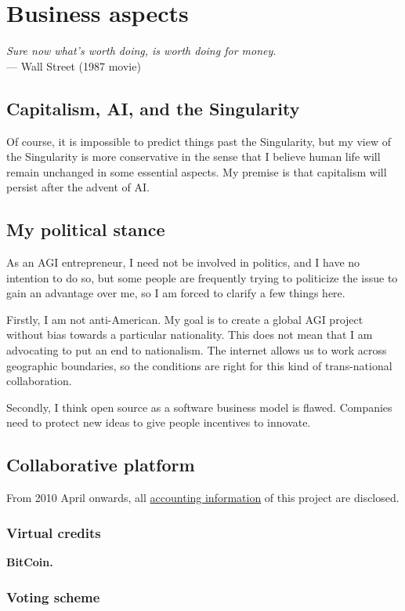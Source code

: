\chapter{Business aspects}
\begin{flushright}
\emph{Sure now what's worth doing, is worth doing for money.}\\
--- Wall Street (1987 movie)
\end{flushright}
\minitoc

\section{Capitalism, AI, and the Singularity}

Of course, it is impossible to predict things past the Singularity, but my view of the Singularity is more conservative in the sense that I believe human life will remain unchanged in some essential aspects.  My premise is that capitalism will persist after the advent of AI.

\section{My political stance}

As an AGI entrepreneur, I need not be involved in politics, and I have no intention to do so, but some people are frequently trying to politicize the issue to gain an advantage over me, so I am forced to clarify a few things here.

Firstly, I am not anti-American.  My goal is to create a global AGI project without bias towards a particular nationality.  This does not mean that I am advocating to put an end to nationalism.  The internet allows us to work across geographic boundaries, so the conditions are right for this kind of trans-national collaboration.

Secondly, I think open source as a software business model is flawed.  Companies need to protect new ideas to give people incentives to innovate.

\underconst

\section{Collaborative platform}

From 2010 April onwards, all \href{http://spreadsheets.google.com/ccc?key=0Ah3_S9SExak-dFA5YTQ2anRfOWxrR2JMM0toekpvVEE&hl=en}
{accounting information} of this project are disclosed.

\subsection{Virtual credits}

\textbf{BitCoin.}

\subsection{Voting scheme}
